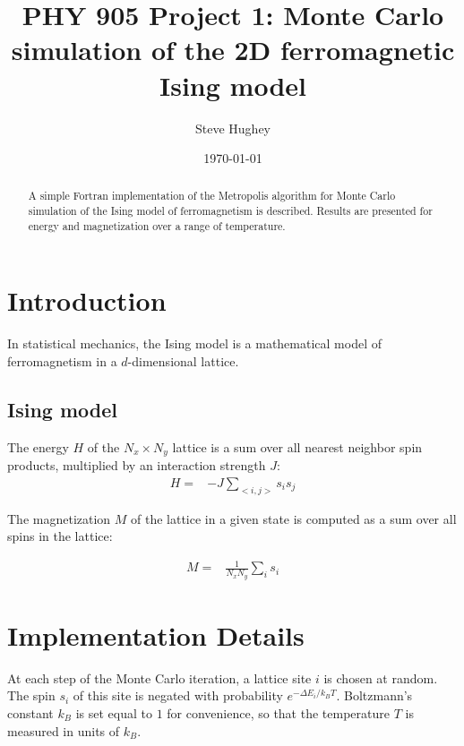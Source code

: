 \documentclass[]{article}
\begin{document}
\title{PHY 905 Project 1: Monte Carlo simulation of the 2D ferromagnetic Ising model}

\author{Steve Hughey}

\date{\today}

\maketitle

\begin{abstract}
A simple Fortran implementation of the Metropolis algorithm for Monte Carlo simulation of the Ising model of ferromagnetism is described. Results are presented for energy and magnetization over a range of temperature.
\end{abstract}

\section{\label{sec:intro}Introduction}

In statistical mechanics, the Ising model is a mathematical model of ferromagnetism in a $d$-dimensional lattice. 

\subsection{\label{sec:ising}Ising model}

The energy $H$ of the $N_x \times N_y$ lattice is a sum over all nearest neighbor spin products, multiplied by an interaction strength $J$:
\begin{align}
H =& -J \sum_{<i,j>} s_i s_j
\end{align}

The magnetization $M$ of the lattice in a given state is computed as a sum over all spins in the lattice:

\begin{align}
M =& \frac{1}{N_x N_y}\sum_{i} s_i
\end{align}

\section{\label{sec:imp}Implementation Details}

At each step of the Monte Carlo iteration, a lattice site $i$ is chosen at random. The spin $s_i$ of this site is negated with probability $e^{-\Delta E_i / k_B T}$. Boltzmann's constant $k_B$ is set equal to $1$ for convenience, so that the temperature $T$ is measured in units of $k_B$.
\end{document}
